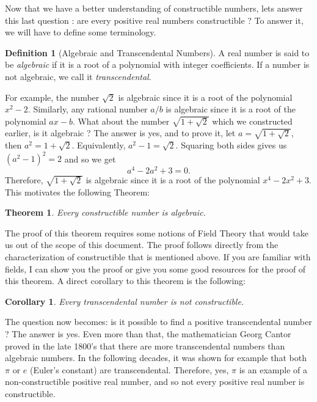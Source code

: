 \documentclass{article}
\theoremstyle{plain}
\newtheorem*{corollary}{Corollary}
\newtheorem*{theorem*}{Theorem}
\theoremstyle{definition}
\newtheorem*{definition}{Definition}
\begin{document}
Now that we have a better understanding of constructible numbers, lets answer this last question : are every positive real numbers constructible ? To answer it, we will have to define some terminology.

\begin{definition}[Algebraic and Transcendental Numbers]
    A real number is said to be \textit{algebraic} if it is a root of a polynomial with integer coefficients. If a number is not algebraic, we call it \textit{transcendental}.
\end{definition}

\noindent For example, the number $\sqrt{2}$ is algebraic since it is a root of the polynomial $x^2 - 2$. Similarly, any rational number $a/b$ is algebraic since it is a root of the polynomial $ax - b$. What about the number $\sqrt{1 + \sqrt{2}}$ which we constructed earlier, is it algebraic ? The answer is yes, and to prove it, let $a = \sqrt{1 + \sqrt{2}}$, then $a^2 = 1 + \sqrt{2}$. Equivalently, $a^2 - 1 = \sqrt{2}$. Squaring both sides gives us $(a^2 - 1)^2 = 2$ and so we get
$$a^4 - 2a^2 + 3 = 0.$$
Therefore, $\sqrt{1 + \sqrt{2}}$ is algebraic since it is a root of the polynomial $x^4 - 2x^2 + 3$. This motivates the following Theorem:

\begin{theorem*}
    Every constructible number is algebraic.
\end{theorem*}

\noindent The proof of this theorem requires some notions of Field Theory that would take us out of the scope of this document. The proof follows directly from the characterization of constructible that is mentioned above. If you are familiar with fields, I can show you the proof or give you some good resources for the proof of this theorem. A direct corollary to this theorem is the following:

\begin{corollary}
    Every transcendental number is not constructible.
\end{corollary}

\noindent The question now becomes: is it possible to find a positive transcendental number ? The answer is yes. Even more than that, the mathematician Georg Cantor proved in the late 1800's that there are more transcendental numbers than algebraic numbers. In the following decades, it was shown for example that both $\pi$ or $e$ (Euler's constant) are transcendental. Therefore, yes, $\pi$ is an example of a non-constructible positive real number, and so not every positive real number is constructible. \\
\end{document}
